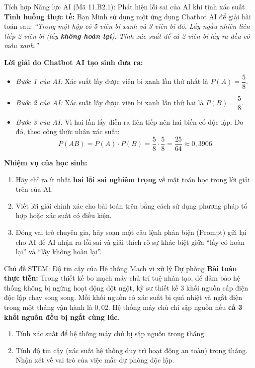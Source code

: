 \documentclass[12pt, a4paper]{article}
\begin{document}
\begin{aibox}{Tích hợp Năng lực AI (Mã 11.B2.1): Phát hiện lỗi sai của AI khi tính xác suất}
\textbf{Tình huống thực tế:} Bạn Minh sử dụng một ứng dụng Chatbot AI để giải bài toán sau:
\textit{``Trong một hộp có 5 viên bi xanh và 3 viên bi đỏ. Lấy ngẫu nhiên liên tiếp 2 viên bi (lấy \textbf{không hoàn lại}). Tính xác suất để cả 2 viên bi lấy ra đều có màu xanh.''}

\textbf{Lời giải do Chatbot AI tạo sinh đưa ra:}
\begin{itemize}[leftmargin=0.5cm]
    \item \textit{Bước 1 của AI:} Xác suất lấy được viên bi xanh lần thứ nhất là $P(A) = \dfrac{5}{8}$.
    \item \textit{Bước 2 của AI:} Xác suất lấy được viên bi xanh lần thứ hai là $P(B) = \dfrac{5}{8}$.
    \item \textit{Bước 3 của AI:} Vì hai lần lấy diễn ra liên tiếp nên hai biến cố độc lập. Do đó, theo công thức nhân xác suất:
    $$P(AB) = P(A) \cdot P(B) = \dfrac{5}{8} \cdot \dfrac{5}{8} = \dfrac{25}{64} \approx 0{,}3906$$
\end{itemize}

\textbf{Nhiệm vụ của học sinh:}
\begin{enumerate}[leftmargin=0.6cm]
    \item Hãy chỉ ra ít nhất \textbf{hai lỗi sai nghiêm trọng} về mặt toán học trong lời giải trên của AI.
    \item Viết lời giải chính xác cho bài toán trên bằng cách sử dụng phương pháp tổ hợp hoặc xác suất có điều kiện.
    \item Đóng vai trò chuyên gia, hãy soạn một câu lệnh phản biện (Prompt) gửi lại cho AI để AI nhận ra lỗi sai và giải thích rõ sự khác biệt giữa ``lấy có hoàn lại'' và ``lấy không hoàn lại''.
\end{enumerate}
\end{aibox}

\begin{stembox}{Chủ đề STEM: Độ tin cậy của Hệ thống Mạch vi xử lý Dự phòng}
\textbf{Bài toán thực tiễn:} Trong thiết kế bo mạch máy chủ trí tuệ nhân tạo, để đảm bảo hệ thống không bị ngừng hoạt động đột ngột, kỹ sư thiết kế $3$ khối nguồn cấp điện độc lập chạy song song. Mỗi khối nguồn có xác suất bị quá nhiệt và ngắt điện trong một tháng vận hành là $0{,}02$. Hệ thống máy chủ chỉ sập nguồn nếu \textbf{cả 3 khối nguồn đều bị ngắt cùng lúc}.
\begin{enumerate}[leftmargin=0.6cm]
    \item Tính xác suất để hệ thống máy chủ bị sập nguồn trong tháng.
    \item Tính độ tin cậy (xác suất hệ thống duy trì hoạt động an toàn) trong tháng. Nhận xét về vai trò của việc mắc dự phòng độc lập.
\end{enumerate}
\end{stembox}
\end{document}

